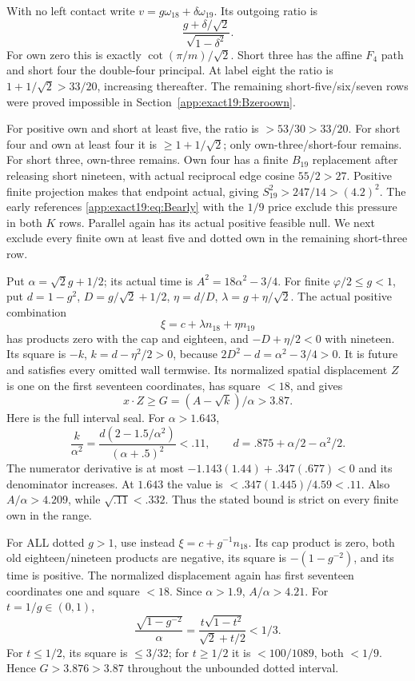 \documentclass[11pt]{article}
\theoremstyle{definition}
\theoremstyle{remark}
\begin{document}
With no left contact write
\(v=g\omega_{18}+\delta\omega_{19}\).
Its outgoing ratio is
\[
                         \frac{g+\delta/\sqrt2}{\sqrt{1-\delta^2}} .
\]
For own zero this is exactly
\(\cot(\pi/m)/\sqrt2\).
Short three has the affine \(F_4\)
path and short four the double-four
principal.
At label eight the ratio is
\(1+1/\sqrt2>33/20\), increasing
thereafter.
The remaining short-five/six/seven
rows were proved impossible in
Section~\ref{app:exact19:Bzeroown}.

For positive own and short at
least five, the ratio is
\(>53/30>33/20\).
For short four and own at least
four it is \(\ge1+1/\sqrt2\);
only own-three/short-four remains.
For short three, own-three remains.
Own four has a finite \(B_{19}\)
replacement after releasing short
nineteen, with actual reciprocal
edge cosine \(55/2>27\).
Positive finite projection makes
that endpoint actual, giving
\(S_{19}^2>247/14>(4.2)^2\).
The early references
\eqref{app:exact19:eq:Bearly}
with the \(1/9\) price exclude
this pressure in both \(K\) rows.
Parallel again has its actual
positive feasible null.
We next exclude every finite
own at least five and dotted
own in the remaining short-three
row.

Put \(\alpha=\sqrt2g+1/2\);
its actual time is
\(A^2=18\alpha^2-3/4\).
For finite \(\varphi/2\le g<1\),
put \(d=1-g^2\), \(D=g/\sqrt2+1/2\),
\(\eta=d/D\), \(\lambda=g+\eta/\sqrt2\).
The actual positive combination
\[
                             \xi=c+\lambda n_{18}+\eta n_{19}
\]
has products zero with the cap
and eighteen, and
\(-D+\eta/2<0\) with nineteen.
Its square is \(-k\),
\(k=d-\eta^2/2>0\), because
\(2D^2-d=\alpha^2-3/4>0\).
It is future and satisfies every
omitted wall termwise.
Its normalized spatial displacement
\(Z\) is one on the first seventeen
coordinates, has square \(<18\),
and gives
\[
                 x\cdot Z\ge G=(A-\sqrt k)/\alpha>3.87 .
\]
Here is the full interval seal.
For \(\alpha>1.643\),
\[
 \frac{k}{\alpha^2}
   =\frac{d(2-1.5/\alpha^2)}{(\alpha+.5)^2}<.11,
 \qquad d=.875+\alpha/2-\alpha^2/2 .
\]
The numerator derivative is at
most \(-1.143(1.44)+.347(.677)<0\)
and its denominator increases.
At \(1.643\) the value is
\(<.347(1.445)/4.59<.11\).
Also \(A/\alpha>4.209\), while
\(\sqrt{.11}<.332\).
Thus the stated bound is strict
on every finite own in the range.

For ALL dotted \(g>1\), use instead
\(\xi=c+g^{-1}n_{18}\).
Its cap product is zero, both
old eighteen/nineteen products
are negative, its square is
\(-(1-g^{-2})\), and its time
is positive.
The normalized displacement again
has first seventeen coordinates
one and square \(<18\).
Since \(\alpha>1.9\),
\(A/\alpha>4.21\).
For \(t=1/g\in(0,1)\),
\[
 \frac{\sqrt{1-g^{-2}}}{\alpha}
       =\frac{t\sqrt{1-t^2}}{\sqrt2+t/2}<1/3 .
\]
For \(t\le1/2\), its square is
\(\le3/32\); for \(t\ge1/2\)
it is \(<100/1089\), both \(<1/9\).
Hence \(G>3.876>3.87\) throughout
the unbounded dotted interval.
\end{document}
